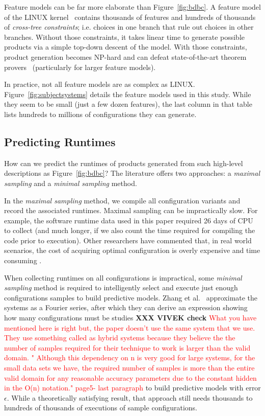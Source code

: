 \documentclass{sig-alternative}
\newcommand{\fig}[1]{Figure~\ref{fig:#1}}
\begin{document}
Feature models can be far more elaborate than \fig{bdbc}. 
A feature model of the LINUX kernel~\cite{sayyad13b} contains thousands of features and hundreds of thousands of  {\em cross-tree constraints}; i.e. choices in one branch that rule out choices in other branches. 
Without those constraints, it takes linear time to generate possible products via a simple
top-down descent of the model. With those constraints, product generation becomes NP-hard and can
 defeat state-of-the-art theorem provers~\cite{pohl11} (particularly for larger feature models).
 
 
 
In practice, not all feature models are as complex as  LINUX.
\fig{subjectsystems} details the feature models used in this study. While
they seem to be small (just a few dozen features), the last column in that table lists hundreds
to millions of configurations they can generate.


\subsection{Predicting Runtimes}\label{sect:addit}
How can we predict the runtimes of products generated from such high-level descriptions
as \fig{bdbc}? The literature offers two approaches: a {\em maximal sampling} and a {\em minimal sampling} method.

In the {\em maximal sampling} method, we compile all  configuration variants and record the associated runtimes. Maximal sampling  can be impractically slow.
For example, the software runtime data used in this paper required  26 days of CPU to collect (and much longer, if we also count the time required
 for compiling the code prior to execution). 
 Other researchers have commented that,  in 
 real world scenarios, the cost of acquiring optimal configuration is overly expensive and time consuming \cite{weiss2008maximizing}.
 
 When collecting runtimes on all configurations is impractical,  some {\em minimal sampling } method
 is required to intelligently select and execute   just enough configurations samples to build
 predictive models.
 Zhang et al.~\cite{zhang2015performance} approximate the
 systems as a Fourier series, after which they can derive an expression showing how many configurations must be studies {\bf XXX VIVEK check}
 \textcolor{red}{What you have mentioned here is right but, the paper doesn't use the same system that we use. They use something called as hybrid systems because they believe the the number of samples required for their technique to work is larger than the valid domain. " Although this dependency on n is very good for
large systems, for the small data sets we have, the required
number of samples is more than the entire valid domain for
any reasonable accuracy parameters due to the constant hidden
in the O(n) notation." page5- last paragraph}
 to build predictive models with error $\epsilon$. While a theoretically satisfying result, that approach still needs thousands to hundreds of thousands of executions of sample
 configurations.  
 
\end{document}
